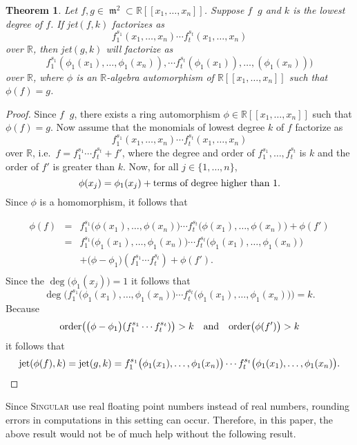 \documentclass[noend]{amsproc}
\newtheorem{theorem}{Theorem}
\theoremstyle{definition}
\DeclareMathOperator{\requiv}{\overset{r}{\sim}}
\DeclareMathOperator{\m}{\mathfrak{m}}
\begin{document}
\begin{theorem}\label{kjet}
Let $f,g\in \m^2\subset\mathbb R[[x_1,\ldots,x_n]]$. Suppose $f\requiv g$
and $k$
is the lowest degree of $f$. If jet$(f,k)$ factorizes as
\[f_1^{s_1}(x_1,\ldots,x_n)\cdots f_t^{s_t}(x_1,\ldots,x_n)\]
over $\mathbb R$, then jet$(g,k)$ will factorize
as \[f_1^{s_1} (\phi_1(x_1),\ldots,\phi_1(x_n)),\cdots
f_t^{s_t}(\phi_1(x_1)),\ldots,(\phi_1(x_n)))\] over $\mathbb R$, where $\phi$
is an $\mathbb R$-algebra automorphism of $\mathbb R[[x_1,\ldots,x_n]]$
such that $\phi(f)=g$.
\end{theorem}
\begin{proof}
Since $f\requiv g$, there exists a ring automorphism $\phi\in\mathbb
R[[x_1,\ldots,x_n]]$ such that  $\phi(f)=g$. Now
assume that the monomials of lowest degree $k$ of $f$ factorize
as \[f_1^{s_1}(x_1,\ldots,x_n)\cdots f_t^{s_t}(x_1,\ldots,x_n)\] over
$\mathbb R$, i.e.~$f=f_1^{s_1}\cdots f_t^{s_t}+f'$, where the degree and order
of
$f_1^{s_1},\ldots,f_t^{s_t}$ is $k$ and the order of $f'$ is greater than $k$.
Now, for all $j\in\{1,\ldots,n\}$, \[\phi(x_j)=\phi_1(x_j)+\textnormal{terms of
degree higher than $1$}.\] Since $\phi$ is a homomorphism, it follows that

\begin{eqnarray*}
\phi(f)&=&f_1^{s_1}\big(\phi(x_1),\ldots,\phi(x_n)\big)\cdots
f_t^{s_t}\big(\phi(x_1),\ldots,\phi(x_n)\big)+\phi(f')\\
&=&f_1^{s_1}\big(\phi_1(x_1),\ldots,\phi_1(x_n)\big)\cdots
f_t^{s_t}\big(\phi_1(x_1),\ldots,\phi_1(x_n)\big)\\
&&+\big(\phi-\phi_1\big)(f_1^{s_1}\cdots f_t^{s_t})+\phi(f').\\
\end{eqnarray*}
Since the $\deg\big(\phi_1(x_j))=1$ it follows that
\[\deg\big(f_1^{s_1}\big(\phi_1(x_1),\ldots,\phi_1(x_n)\big)\cdots
f_t^{s_t}\big(\phi_1(x_1),\ldots,\phi_1(x_n)\big)\big)=k.\] Because
\[
\textnormal{order}\big(\big(\phi-\phi_1\big)(f_1^{s_1}\cdots f_t^{s_t})\big)>k
\quad\textnormal{and}\quad\textnormal{order}\big(\phi(f')\big)>k
\]
it follows that
\begin{eqnarray*}
\textnormal{jet}(\phi(f),k)=\textnormal{jet}(g,k)
=f_1^{s_1}\big(\phi_1(x_1),\ldots,\phi_1(x_n)\big)\cdots
f_t^{s_t}\big(\phi_1(x_1),\ldots,\phi_1(x_n)\big).
\end{eqnarray*}
\end{proof}

Since \textsc{Singular} use real floating point numbers instead of real
numbers, rounding errors in computations in this setting can
occur. Therefore, in this paper, the above result would not be of much help
without the
following result.
\end{document}
